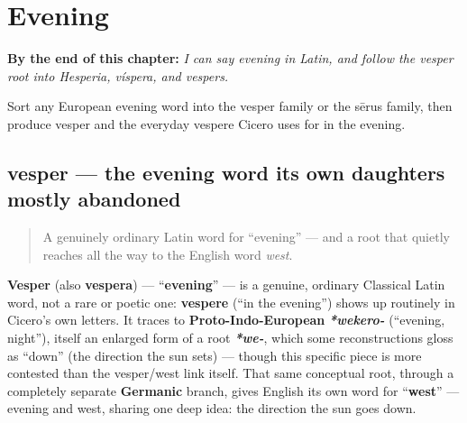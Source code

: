 
\chapter{Evening}
\label{ch:la-evening}

\begin{chapteropening}
\textbf{By the end of this chapter:} \emph{I can say evening in Latin, and follow the vesper root into Hesperia, víspera, and vespers.}

Sort any European evening word into the vesper family or the sērus family, then produce vesper and the everyday vespere Cicero uses for in the evening.
\end{chapteropening}

\section[vesper]{vesper — the evening word its own daughters mostly abandoned}

\label{lesson:LA-C33-vesper}



\begin{quote}
A genuinely ordinary Latin word for \textquotedblleft{}evening\textquotedblright{} — and a root that quietly reaches all the way to the English word \emph{west}.
\end{quote}

\begin{cousinweb}
\textbf{Vesper} (also \textbf{vespera}) — \textquotedblleft{}\textbf{evening}\textquotedblright{} — is a genuine, ordinary Classical Latin word, not a rare or poetic one: \textbf{vespere} (\textquotedblleft{}in the evening\textquotedblright{}) shows up routinely in Cicero's own letters. It traces to \textbf{Proto-Indo-European} \emph{\textbf{*wekero-}} (\textquotedblleft{}evening, night\textquotedblright{}), itself an enlarged form of a root \emph{\textbf{*we-}}, which some reconstructions gloss as \textquotedblleft{}down\textquotedblright{} (the direction the sun sets) — though this specific piece is more contested than the vesper/west link itself. That same conceptual root, through a completely separate \textbf{Germanic} branch, gives English its own word for \textquotedblleft{}\textbf{west}\textquotedblright{} — evening and west, sharing one deep idea: the direction the sun goes down.
\end{cousinweb}

